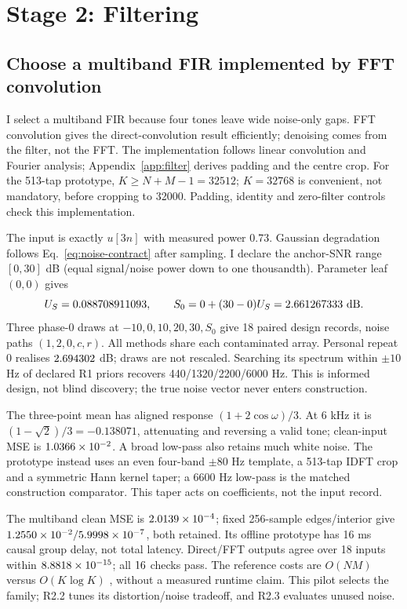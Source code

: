 \FloatBarrier
\section{Stage 2: Filtering}
\subsection{Choose a multiband FIR implemented by FFT convolution}
\label{sec:r21}
I select a multiband FIR because four tones leave wide noise-only gaps.
FFT convolution gives the direct-convolution result efficiently; denoising
comes from the filter, not the FFT. The implementation follows linear
convolution and Fourier analysis;
Appendix~\ref{app:filter} derives padding and the centre crop.
For the 513-tap prototype, $K\ge N+M-1=32512$; $K=32768$ is convenient,
not mandatory, before cropping to 32000. Padding, identity and zero-filter
controls check this implementation.

The input is exactly $ u[3n]$ with measured power 0.73. Gaussian degradation
follows Eq.~\eqref{eq:noise-contract} after sampling. I declare the
anchor-SNR range $[0,30]$ dB (equal signal/noise power down to one
thousandth). Parameter leaf $(0,0)$ gives
\begin{equation}
 U_S=0.088708911093,\qquad
 S_0=0+(30-0)U_S=2.661267333\ {\rm dB}.
 \label{eq:r21-personal-snr}
\end{equation}
Three phase-0 draws at $-10,0,10,20,30,S_0 $ give 18 paired design records,
noise paths $(1,2,0,c,r)$. All methods share each contaminated array.
Personal repeat 0 realises $2.694302 $ dB; draws are not rescaled.
Searching its spectrum within $\pm10 $ Hz of declared R1 priors recovers
440/1320/2200/6000 Hz. This is informed design, not blind discovery;
the true noise vector never enters construction.

The three-point mean has aligned response $(1+2\cos\omega)/3 $.
At 6 kHz it is $(1-\sqrt2)/3=-0.138071 $, attenuating and reversing a valid
tone; clean-input MSE is $1.0366\times10^{-2} $. A broad low-pass also retains
much white noise. The prototype instead uses an even four-band
$\pm80 $ Hz template, a 513-tap IDFT crop and a symmetric Hann kernel
taper; a 6600 Hz low-pass is the matched construction comparator.
This taper acts on coefficients, not the input record.

\begin{table}[!htbp]
 \centering\small
 \caption{Method-selection pilot: three paired design draws per level, all 32000 samples. Prototype parameters are provisional; these are design results.}
 \label{tab:r21-pilot}
 
\end{table}

The multiband clean MSE is $2.0139\times10^{-4}$; fixed 256-sample
edges/interior give $1.2550\times10^{-2}/5.9998\times10^{-7}$, both retained.
Its offline prototype has 16 ms causal group delay, not total latency.
Direct/FFT outputs agree over 18 inputs within $8.8818\times10^{-15}$;
all $16$ checks pass. The reference costs are
$O(NM)$ versus $O(K\log K)$ \citep{duhamel1990fft}, without a measured runtime claim.
This pilot selects the family; R2.2 tunes its distortion/noise tradeoff,
and R2.3 evaluates unused noise.
